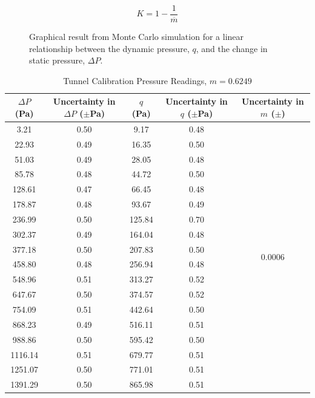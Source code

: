 \documentclass[journal,letterpaper]{IEEEtran}
\begin{document}
\begin{equation} \label{eq:K}
    K = 1 - \frac{1}{\overline{m}}
\end{equation}

\begin{figure}[H]
    \centering
    
    \caption{Graphical result from Monte Carlo simulation for a linear relationship between the dynamic pressure, $q$, and the change in static pressure, $\Delta P$.}
    \label{fig:Monte}
\end{figure}

\begin{table}[H]
    \centering
    \caption{Tunnel Calibration Pressure Readings, $m = 0.6249$}
    \begin{tabular}{ccccc}
    \toprule
    $\Delta P$ (\unit{\pascal}) & \makecell{Uncertainty \\ in $\Delta P$ ($\pm$\unit{\pascal})} & $q$ (\unit{\pascal}) & \makecell{Uncertainty \\ in $q$ ($\pm$\unit{\pascal})} & \makecell{Uncertainty \\ in $m$ ($\pm$)} \\ \midrule \midrule
    3.21    & 0.50 & 9.17   & 0.48 & \multirow{18}{*}{0.0006} \\
    22.93   & 0.49 & 16.35  & 0.50 &                          \\
    51.03   & 0.49 & 28.05  & 0.48 &                          \\
    85.78   & 0.48 & 44.72  & 0.50 &                          \\
    128.61  & 0.47 & 66.45  & 0.48 &                          \\
    178.87  & 0.48 & 93.67  & 0.49 &                          \\
    236.99  & 0.50 & 125.84 & 0.70 &                          \\
    302.37  & 0.49 & 164.04 & 0.48 &                          \\
    377.18  & 0.50 & 207.83 & 0.50 &                          \\
    458.80  & 0.48 & 256.94 & 0.48 &                          \\
    548.96  & 0.51 & 313.27 & 0.52 &                          \\
    647.67  & 0.50 & 374.57 & 0.52 &                          \\
    754.09  & 0.51 & 442.64 & 0.50 &                          \\
    868.23  & 0.49 & 516.11 & 0.51 &                          \\
    988.86  & 0.50 & 595.42 & 0.50 &                          \\
    1116.14 & 0.51 & 679.77 & 0.51 &                          \\
    1251.07 & 0.50 & 771.01 & 0.51 &                          \\
    1391.29 & 0.50 & 865.98 & 0.51 &                          \\ \bottomrule
    \end{tabular}
    \label{tab:avgdData}
\end{table}
\end{document}
